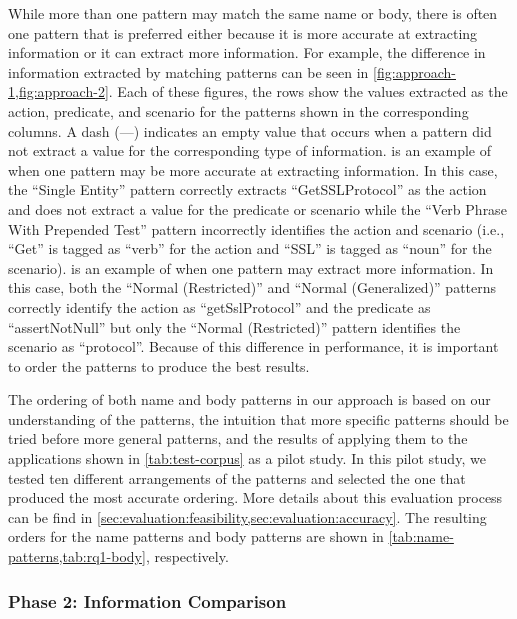 \documentclass[proposal.tex]{subfiles}
\begin{document}
While more than one pattern may match the same name or body, there is often one pattern that is preferred either because it is more accurate at extracting information or it can extract more information.
%
For example, the difference in information extracted by matching patterns can be seen in \cref{fig:approach-1,fig:approach-2}.
%
Each of these figures, the rows show the values extracted as the action, predicate, and scenario for the patterns shown in the corresponding columns.
%
A dash (---) indicates an empty value that occurs when a pattern did not extract a value for the corresponding type of information.
%
 is an example of when one pattern may be more accurate at extracting information.
%
In this case, the \enquote{Single Entity} pattern correctly extracts \enquote{GetSSLProtocol} as the action and does not extract a value for the predicate or scenario while the \enquote{Verb Phrase With Prepended Test} pattern incorrectly identifies the action and scenario (i.e., \enquote{Get} is tagged as \enquote{verb} for the action and \enquote{SSL} is tagged as \enquote{noun} for the scenario).
%
 is an example of when one pattern may extract more information.
%
In this case, both the \enquote{Normal (Restricted)} and \enquote{Normal (Generalized)} patterns correctly identify the action as \enquote{getSslProtocol} and the predicate as \enquote{assertNotNull} but only the \enquote{Normal (Restricted)} pattern identifies the scenario as \enquote{protocol}.
%
Because of this difference in performance, it is important to order the patterns to produce the best results.


The ordering of both name and body patterns in our approach is based on our understanding of the patterns, the intuition that more specific patterns should be tried before more general patterns, and the results of applying them to the applications shown in \cref{tab:test-corpus} as a pilot study.
%
In this pilot study, we tested ten different arrangements of the patterns and selected the one that produced the most accurate ordering.
%
More details about this evaluation process can be find in \cref{sec:evaluation:feasibility,sec:evaluation:accuracy}.
%
The resulting orders for the name patterns and body patterns are shown in \cref{tab:name-patterns,tab:rq1-body}, respectively.



\subsubsection{Phase 2: Information Comparison}
\label{sec:InformationComparison}
\end{document}
